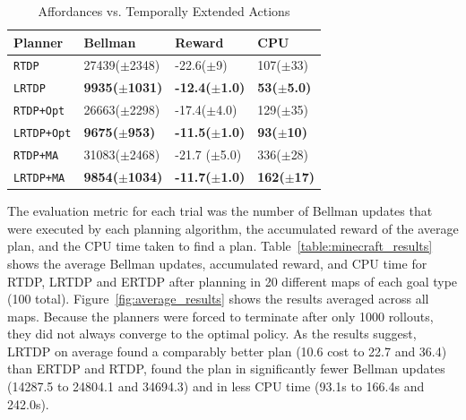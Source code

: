 \documentclass[letterpaper]{article}
\newcommand{\dnote}[1]{\textcolor{Green}{\textbf{}}}
\newcommand{\ra}[1]{\renewcommand{\arraystretch}{#1}} %
\begin{document}
\begin{table}[b]
\ra{1.3}
\begin{tabular}{@{}llll@{}}\toprule
Planner & Bellman & Reward & CPU \\ \midrule
\texttt{RTDP}   			&	27439($\pm$2348)	&	-22.6($\pm$9)& 107($\pm$33) \\
\texttt{LRTDP} 			& 	{\bf 9935($\pm$1031)}	&	{\bf -12.4($\pm$1.0)}& \bf{53}($\pm$5.0) \\ \hline
\texttt{RTDP+Opt}  		&	26663($\pm$2298)	&	-17.4($\pm$4.0) & 129($\pm$35) \\
\texttt{LRTDP+Opt} 		& 	\bf{9675}($\pm$953)	&	\bf{-11.5}($\pm$1.0)&{\bf 93($\pm$10)} \\ \hline
\texttt{RTDP+MA}  		&	31083($\pm$2468)	&	-21.7	($\pm$5.0)&336($\pm$28) \\
\texttt{LRTDP+MA}  		& 	{\bf 9854($\pm$1034)}	&	{\bf -11.7($\pm$1.0)}&{\bf 162($\pm$17)} \\ %
\bottomrule
\end{tabular}
\label{table:temp_ext_act_results}
\caption{Affordances vs. Temporally Extended Actions}
\end{table}

The evaluation metric for each trial was the number of Bellman updates
that were executed by each planning algorithm, the accumulated reward of the average plan,
and the CPU time taken to find a plan. Table~\ref{table:minecraft_results} shows the average Bellman updates, accumulated reward, and CPU time
for RTDP, LRTDP and ERTDP after planning in 20 different maps of each goal type (100 total). Figure~\ref{fig:average_results} shows the results averaged across all maps. Because the planners were forced to terminate after only 1000 rollouts, they did not always converge to the optimal policy. As the results suggest, LRTDP on average found a comparably better plan (10.6 cost to 22.7 and 36.4) than ERTDP and RTDP, found the plan in significantly fewer Bellman updates (14287.5 to 24804.1 and 34694.3) and in less CPU time (93.1s to 166.4s and 242.0s).

\dnote{Put in a note about the threshold issues, maybe include the results below to reinforce threshold business}

\dnote{Thoughts on including results on larger maps, too?}
\end{document}
